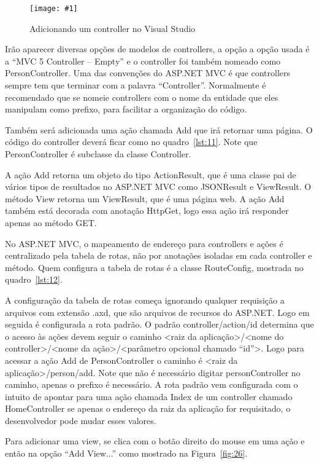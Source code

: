 \documentclass[a4paper,12pt]{article}
\newcommand{\figura}[3] {
	\begin{figure}[ht]
		\centering
		\texttt{[image: \#1]}
		\caption{#2}
		\label{#3}
	\end{figure}
	\FloatBarrier
}
\newcommand{\sharpcode}[3] {
	
}
\begin{document}
\figura{25.png}{Adicionando um controller no Visual Studio}{fig:25}

Irão aparecer diversas opções de modelos de controllers, a opção a opção usada é a “MVC 5 Controller – Empty” e o controller foi também nomeado como PersonController. Uma das convenções do ASP.NET MVC é que controllers sempre tem que terminar com a palavra “Controller”. Normalmente é recomendado que se nomeie controllers com o nome da entidade que eles manipulam como prefixo, para facilitar a organização do código.

Também será adicionada uma ação chamada Add que irá retornar uma página. O código do controller deverá ficar como no quadro~\ref{lst:11}. Note que PersonController é subclasse da classe Controller.

\sharpcode{code/11.txt}{PersonController em C\#}{lst:11}

A ação Add retorna um objeto do tipo ActionResult, que é uma classe pai de vários tipos de resultados no ASP.NET MVC como JSONResult e ViewResult. O método View retorna um ViewResult, que é uma página web. A ação Add também está decorada com anotação HttpGet, logo essa ação irá responder apenas ao método GET.

No ASP.NET MVC, o mapeamento de endereço para controllers e ações é centralizado pela tabela de rotas, não por anotações isoladas em cada controller e método. Quem configura a tabela de rotas é a classe RouteConfig, mostrada no quadro~\ref{lst:12}.

\sharpcode{code/12.txt}{A classe RouteConfig}{lst:12}

A configuração da tabela de rotas começa ignorando qualquer requisição a arquivos com extensão .axd, que são arquivos de recursos do ASP.NET. Logo em seguida é configurada a rota padrão. O padrão {controller}/{action}/{id} determina que o acesso às ações devem seguir o caminho <raiz da aplicação>/<nome do controller>/<nome da ação>/<parâmetro opcional chamado “id”>. Logo para acessar a ação Add de PersonController o caminho é <raiz da aplicação>/person/add. Note que não é necessário digitar personController no caminho, apenas o prefixo é necessário. A rota padrão vem configurada com o intuito de apontar para uma ação chamada Index de um controller chamado HomeController se apenas o endereço da raiz da aplicação for requisitado, o desenvolvedor pode mudar esses valores. 

Para adicionar uma view, se clica com o botão direito do mouse em uma ação e então na opção “Add View...” como mostrado na Figura~\ref{fig:26}. 
\end{document}
